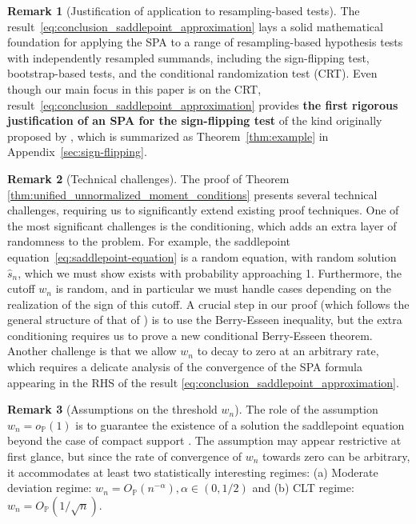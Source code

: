 \documentclass[12pt]{article}
\theoremstyle{definition}
\newtheorem{remark}{Remark}
\def\P{\mathbb{P}}
\def\P{\mathbb{P}}
\renewcommand{\P}{\mathbb{P}}							%
\begin{document}
  \begin{remark}[Justification of application to resampling-based tests]
	The result~\eqref{eq:conclusion_saddlepoint_approximation} lays a solid mathematical foundation for applying the SPA to a range of resampling-based hypothesis tests with independently resampled summands, including the sign-flipping test, bootstrap-based tests, and the conditional randomization test (CRT). Even though our main focus in this paper is on the CRT, result~\eqref{eq:conclusion_saddlepoint_approximation} provides \textbf{the first rigorous justification of an SPA for the sign-flipping test} of the kind originally proposed by \citet{Daniels1955}, which is summarized as Theorem~\ref{thm:example} in Appendix~\ref{sec:sign-flipping}. 
  \end{remark}
	
  \begin{remark}[Technical challenges]
	The proof of Theorem \ref{thm:unified_unnormalized_moment_conditions} presents several technical challenges, requiring us to significantly extend existing proof techniques. One of the most significant challenges is the conditioning, which adds an extra layer of randomness to the problem. For example, the saddlepoint equation~\eqref{eq:saddlepoint-equation} is a random equation, with random solution $\hat s_n$, which we must show exists with probability approaching 1. Furthermore, the cutoff $w_n$ is random, and in particular we must handle cases depending on the realization of the sign of this cutoff. A crucial step in our proof (which follows the general structure of that of \cite{Robinson1982}) is to use the Berry-Esseen inequality, but the extra conditioning requires us to prove a new conditional Berry-Esseen theorem. Another challenge is that we allow $w_n$ to decay to zero at an arbitrary rate, which requires a delicate analysis of the convergence of the SPA formula appearing in the RHS of the result \eqref{eq:conclusion_saddlepoint_approximation}. 
  \end{remark}
  
  \begin{remark}[Assumptions on the threshold $w_n$]
  The role of the assumption $w_n = o_\P(1)$ is to guarantee the existence of a solution the saddlepoint equation beyond the case of compact support \citep{Daniels1954}. The assumption may appear restrictive at first glance, but since the rate of convergence of $w_n$ towards zero can be arbitrary, it accommodates at least two statistically interesting regimes: (a) Moderate deviation regime: $w_n=O_{\P}(n^{-\alpha}),\alpha\in (0,1/2)$ and (b) CLT regime: $w_n=O_{\P}(1/\sqrt{n})$. 
  \end{remark}
  
\end{document}
